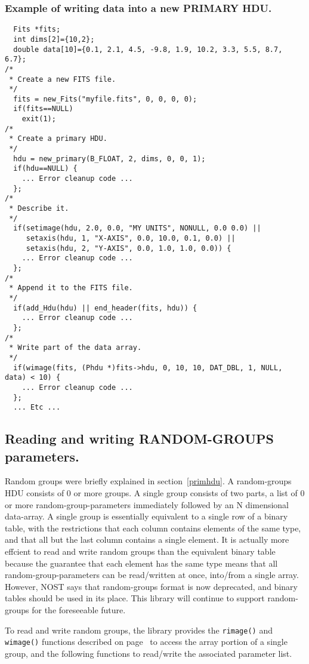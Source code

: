 \subsubsection{Example of writing data into a new PRIMARY HDU.}
\begin{verbatim}
  Fits *fits;
  int dims[2]={10,2};
  double data[10]={0.1, 2.1, 4.5, -9.8, 1.9, 10.2, 3.3, 5.5, 8.7, 6.7};
/*
 * Create a new FITS file.
 */
  fits = new_Fits("myfile.fits", 0, 0, 0, 0);
  if(fits==NULL)
    exit(1);
/*
 * Create a primary HDU.
 */
  hdu = new_primary(B_FLOAT, 2, dims, 0, 0, 1);
  if(hdu==NULL) {
    ... Error cleanup code ...
  };
/*
 * Describe it.
 */
  if(setimage(hdu, 2.0, 0.0, "MY UNITS", NONULL, 0.0 0.0) ||
     setaxis(hdu, 1, "X-AXIS", 0.0, 10.0, 0.1, 0.0) ||
     setaxis(hdu, 2, "Y-AXIS", 0.0, 1.0, 1.0, 0.0)) {
    ... Error cleanup code ...
  };
/*
 * Append it to the FITS file.
 */
  if(add_Hdu(hdu) || end_header(fits, hdu)) {
    ... Error cleanup code ...
  };
/*
 * Write part of the data array.
 */
  if(wimage(fits, (Phdu *)fits->hdu, 0, 10, 10, DAT_DBL, 1, NULL, data) < 10) {
    ... Error cleanup code ...
  };
  ... Etc ...
\end{verbatim}

\subsection{Reading and writing RANDOM-GROUPS parameters.}

Random groups were briefly explained in section~\ref{primhdu}. A
random-groups HDU consists of 0 or more groups. A single group
consists of two parts, a list of 0 or more random-group-parameters
immediately followed by an N dimensional data-array. A single
group is essentially equivalent to a single row of a binary table,
with the restrictions that each column contains elements of the same
type, and that all but the last column contains a single element. It is
actually more effcient to read and write random groups than the
equivalent binary table because the guarantee that each element has
the same type means that all random-group-parameters can be
read/written at once, into/from a single array. However, NOST says
that random-groups format is now deprecated, and binary tables should
be used in its place. This library will continue to support
random-groups for the foreseeable future.

To read and write random groups, the library provides the
\verb`rimage()` and \verb`wimage()` functions described on
page~\pageref{rimage} to access the array portion of a single group,
and the following functions to read/write the associated parameter
list.

